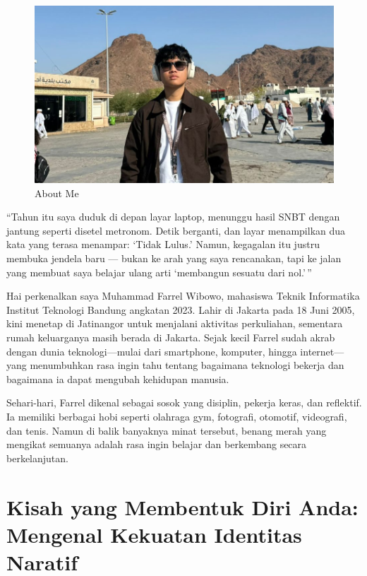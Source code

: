 \documentclass[
  letterpaper,
  DIV=11,
  numbers=noendperiod]{scrreprt}
\begin{document}
\begin{figure}[H]

{\centering \includegraphics[width=9.5\linewidth,height=\textheight,keepaspectratio]{All_About_me/../images/profile-pict.jpeg}

}

\caption{About Me}

\end{figure}%

``Tahun itu saya duduk di depan layar laptop, menunggu hasil SNBT dengan
jantung seperti disetel metronom. Detik berganti, dan layar menampilkan
dua kata yang terasa menampar: `Tidak Lulus.' Namun, kegagalan itu
justru membuka jendela baru --- bukan ke arah yang saya rencanakan, tapi
ke jalan yang membuat saya belajar ulang arti `membangun sesuatu dari
nol.'\,''

Hai perkenalkan saya Muhammad Farrel Wibowo, mahasiswa Teknik
Informatika Institut Teknologi Bandung angkatan 2023. Lahir di Jakarta
pada 18 Juni 2005, kini menetap di Jatinangor untuk menjalani aktivitas
perkuliahan, sementara rumah keluarganya masih berada di Jakarta. Sejak
kecil Farrel sudah akrab dengan dunia teknologi---mulai dari smartphone,
komputer, hingga internet---yang menumbuhkan rasa ingin tahu tentang
bagaimana teknologi bekerja dan bagaimana ia dapat mengubah kehidupan
manusia.

Sehari-hari, Farrel dikenal sebagai sosok yang disiplin, pekerja keras,
dan reflektif. Ia memiliki berbagai hobi seperti olahraga gym,
fotografi, otomotif, videografi, dan tenis. Namun di balik banyaknya
minat tersebut, benang merah yang mengikat semuanya adalah rasa ingin
belajar dan berkembang secara berkelanjutan.

\section{\texorpdfstring{\textbf{Kisah yang Membentuk Diri Anda:
Mengenal Kekuatan Identitas
Naratif}}{Kisah yang Membentuk Diri Anda: Mengenal Kekuatan Identitas Naratif}}\label{kisah-yang-membentuk-diri-anda-mengenal-kekuatan-identitas-naratif}
\end{document}
